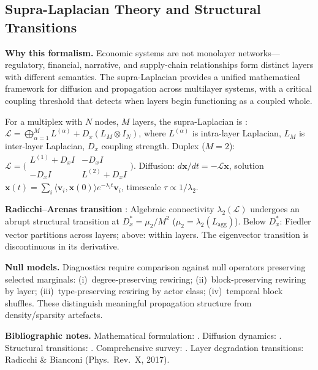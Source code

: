 \documentclass[11pt,a4paper]{article}
\theoremstyle{definition}
\newcommand{\bx}{\bm{x}}
\begin{document}
\begin{appendices}
\section{Supra-Laplacian Theory and Structural Transitions}
\label{app:supra_laplacian}

\textbf{Why this formalism.} Economic systems are not monolayer networks---regulatory, financial, narrative, and supply-chain relationships form distinct layers with different semantics. The supra-Laplacian provides a unified mathematical framework for diffusion and propagation across multilayer systems, with a critical coupling threshold that detects when layers begin functioning as a coupled whole.

For a multiplex with $N$ nodes, $M$ layers, the supra-Laplacian is \citep{gomez2013diffusion,de2013mathematical}:
$\mathcal{L} = \bigoplus_{\alpha=1}^M L^{(\alpha)} + D_x(L_M \otimes I_N)$,
where $L^{(\alpha)}$ is intra-layer Laplacian, $L_M$ is inter-layer Laplacian, $D_x$ coupling strength. Duplex ($M=2$):
$\mathcal{L} = \bigl(\begin{smallmatrix} L^{(1)} + D_x I & -D_x I \\ -D_x I & L^{(2)} + D_x I \end{smallmatrix}\bigr)$.
Diffusion: $d\bx/dt = -\mathcal{L}\bx$, solution $\bx(t) = \sum_i \langle \bm{v}_i, \bx(0)\rangle e^{-\lambda_i t}\bm{v}_i$, timescale $\tau \propto 1/\lambda_2$.

\textbf{Radicchi--Arenas transition} \citep{radicchi2013abrupt}: Algebraic connectivity $\lambda_2(\mathcal{L})$ undergoes an abrupt structural transition at $D_x^* = \mu_2/M^2$ ($\mu_2 = \lambda_2(L_{\mathrm{agg}})$). Below $D_x^*$: Fiedler vector partitions across layers; above: within layers. The eigenvector transition is discontinuous in its derivative.

\textbf{Null models.} Diagnostics require comparison against null operators preserving selected marginals: (i)~degree-preserving rewiring; (ii)~block-preserving rewiring by layer; (iii)~type-preserving rewiring by actor class; (iv)~temporal block shuffles. These distinguish meaningful propagation structure from density/sparsity artefacts.

\textbf{Bibliographic notes.} Mathematical formulation: \citet{de2013mathematical}. Diffusion dynamics: \citet{gomez2013diffusion}. Structural transitions: \citet{radicchi2013abrupt}. Comprehensive survey: \citet{kivela2014multilayer,boccaletti2014structure}. Layer degradation transitions: Radicchi \& Bianconi (Phys.\ Rev.\ X, 2017).



\end{appendices}
\end{document}
